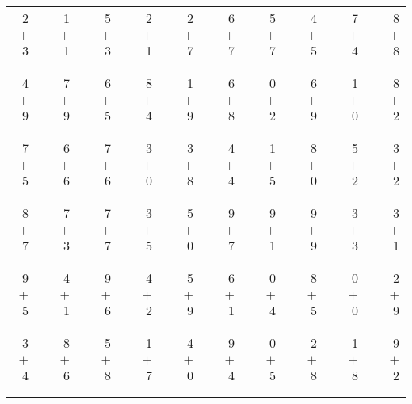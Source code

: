 \documentclass[12pt, letterpaper]{article}
\begin{document}
\begin{tabular}{rrrrrrrrrrrrrrrrrrr}
2 & & 1 & & 5 & & 2 & & 2 & & 6 & & 5 & & 4 & & 7 & & 8\\
$+$ 3 & & $+$ 1 & & $+$ 3 & & $+$ 1 & & $+$ 7 & & $+$ 7 & & $+$ 7 & & $+$ 5 & & $+$ 4 & & $+$ 8\\
\cline{1-1} \cline{3-3} \cline{5-5} \cline{7-7} \cline{9-9} \cline{11-11} \cline{13-13} \cline{15-15} \cline{17-17} \cline{19-19} \\ \\
4 & & 7 & & 6 & & 8 & & 1 & & 6 & & 0 & & 6 & & 1 & & 8\\
$+$ 9 & & $+$ 9 & & $+$ 5 & & $+$ 4 & & $+$ 9 & & $+$ 8 & & $+$ 2 & & $+$ 9 & & $+$ 0 & & $+$ 2\\
\cline{1-1} \cline{3-3} \cline{5-5} \cline{7-7} \cline{9-9} \cline{11-11} \cline{13-13} \cline{15-15} \cline{17-17} \cline{19-19} \\ \\
7 & & 6 & & 7 & & 3 & & 3 & & 4 & & 1 & & 8 & & 5 & & 3\\
$+$ 5 & & $+$ 6 & & $+$ 6 & & $+$ 0 & & $+$ 8 & & $+$ 4 & & $+$ 5 & & $+$ 0 & & $+$ 2 & & $+$ 2\\
\cline{1-1} \cline{3-3} \cline{5-5} \cline{7-7} \cline{9-9} \cline{11-11} \cline{13-13} \cline{15-15} \cline{17-17} \cline{19-19} \\ \\
8 & & 7 & & 7 & & 3 & & 5 & & 9 & & 9 & & 9 & & 3 & & 3\\
$+$ 7 & & $+$ 3 & & $+$ 7 & & $+$ 5 & & $+$ 0 & & $+$ 7 & & $+$ 1 & & $+$ 9 & & $+$ 3 & & $+$ 1\\
\cline{1-1} \cline{3-3} \cline{5-5} \cline{7-7} \cline{9-9} \cline{11-11} \cline{13-13} \cline{15-15} \cline{17-17} \cline{19-19} \\ \\
9 & & 4 & & 9 & & 4 & & 5 & & 6 & & 0 & & 8 & & 0 & & 2\\
$+$ 5 & & $+$ 1 & & $+$ 6 & & $+$ 2 & & $+$ 9 & & $+$ 1 & & $+$ 4 & & $+$ 5 & & $+$ 0 & & $+$ 9\\
\cline{1-1} \cline{3-3} \cline{5-5} \cline{7-7} \cline{9-9} \cline{11-11} \cline{13-13} \cline{15-15} \cline{17-17} \cline{19-19} \\ \\
3 & & 8 & & 5 & & 1 & & 4 & & 9 & & 0 & & 2 & & 1 & & 9\\
$+$ 4 & & $+$ 6 & & $+$ 8 & & $+$ 7 & & $+$ 0 & & $+$ 4 & & $+$ 5 & & $+$ 8 & & $+$ 8 & & $+$ 2\\
\cline{1-1} \cline{3-3} \cline{5-5} \cline{7-7} \cline{9-9} \cline{11-11} \cline{13-13} \cline{15-15} \cline{17-17} \cline{19-19} \\ \\

\end{tabular}
\end{document}
